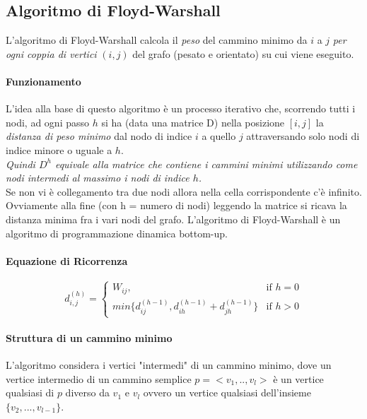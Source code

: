 \subsection{Algoritmo di Floyd-Warshall}
L'algoritmo di Floyd-Warshall calcola il \emph{peso} del cammino minimo da $i$ a $j$ \emph{per ogni coppia di vertici} $(i,j)$ del grafo (pesato e orientato) su cui viene eseguito.

\paragraph{Funzionamento}
L'idea alla base di questo algoritmo è un processo iterativo che, scorrendo tutti i nodi, ad ogni passo $h$ si ha
(data una matrice D) nella posizione $[i,j]$ la \emph{distanza di peso minimo} dal nodo di indice $i$ a quello $j$ attraversando solo nodi di indice minore o uguale a $h$.\\
\textit{Quindi $D^h$ equivale alla matrice che contiene i cammini minimi utilizzando come nodi intermedi al massimo i nodi di indice $h$.}
\\Se non vi è collegamento tra due nodi allora nella cella corrispondente c'è infinito.
Ovviamente alla fine (con h = numero di nodi) leggendo la matrice si ricava la distanza minima fra i vari nodi del grafo.
L'algoritmo di Floyd-Warshall è un algoritmo di programmazione dinamica bottom-up.

\paragraph{Equazione di Ricorrenza}

\begin{equation*}
	d^{(h)}_{i,j}= \begin{cases}
		W_{ij},                                                & \text{if $h = 0$} \\
		min\{ d^{(h-1)}_{ij},d^{(h-1)}_{ih} + d^{(h-1)}_{jh}\} & \text{if $h > 0$}
	\end{cases}
\end{equation*}
\paragraph*{Struttura di un cammino minimo}
L'algoritmo considera i vertici "intermedi" di un cammino minimo, dove un vertice intermedio di un cammino semplice $p=<v_1,..,v_l>$
è un vertice qualsiasi di $p$ diverso da $v_1$ e $v_l$ ovvero un vertice qualsiasi dell'insieme $\{v_2,...,v_{l-1}\}$.

